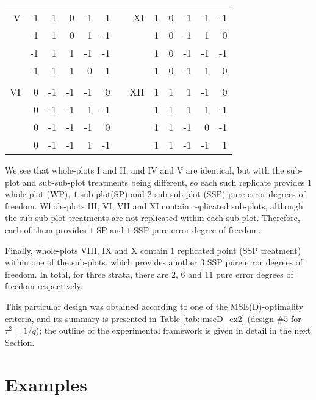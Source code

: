 \begin{table}[h]
{\begin{tabular}{r|rr|r|rr|rr|rr|r|rr|}
    &    &    &    &    &    & &      &   &    &    &    &    \\ \cline{2-6} \cline{9-13}
V   & -1 & 1  & 0  & -1 & 1  & & XI   & 1 & 0  & -1 & -1 & -1 \\
    & -1 & 1  & 0  & 1  & -1 & &      & 1 & 0  & -1 & 1  & 0  \\\cline{4-6} \cline{11-13}
    & -1 & 1  & 1  & -1 & -1 & &      & 1 & 0  & -1 & -1 & -1 \\
    & -1 & 1  & 1  & 0  & 1  & &      & 1 & 0  & -1 & 1  & 0  \\ \cline{2-6} \cline{9-13}
    &    &    &    &    &    & &      &   &    &    &    &    \\ \cline{2-6} \cline{9-13}
VI  & 0  & -1 & -1 & -1 & 0  & & XII  & 1 & 1  & 1  & -1 & 0  \\
    & 0  & -1 & -1 & 1  & -1 & &      & 1 & 1  & 1  & 1  & -1 \\ \cline{4-6} \cline{11-13}
    & 0  & -1 & -1 & -1 & 0  & &      & 1 & 1  & -1 & 0  & -1 \\
    & 0  & -1 & -1 & 1  & -1 & &      & 1 & 1  & -1 & -1 & 1  \\ \cline{2-6} \cline{9-13}
\end{tabular}
}
\end{table}    

We see that whole-plots I and II, and IV and V are identical, but with the sub-plot and sub-sub-plot treatments being different, so each such replicate provides $1$ whole-plot (WP), $1$ sub-plot(SP) and $2$ sub-sub-plot (SSP) pure error degrees of freedom. Whole-plots III, VI, VII and XI contain replicated sub-plots, although the sub-sub-plot treatments are not replicated within each sub-plot. Therefore, each of them provides $1$ SP and $1$ SSP pure error degree of freedom. 

Finally, whole-plots VIII, IX and X contain $1$ replicated point (SSP treatment) within one of the sub-plots, which provides another $3$ SSP pure error degrees of freedom. In total, for three strata, there are $2$, $6$ and $11$ pure error degrees of freedom respectively.

This particular design was obtained according to one of the MSE(D)-optimality criteria, and its summary is presented in Table \ref{tab::mseD_ex2} (design \#$5$ for $\tau^2=1/q$); the outline of the experimental framework is given in detail in the next Section.

\section{Examples}
\label{sec::ch7_ex}


